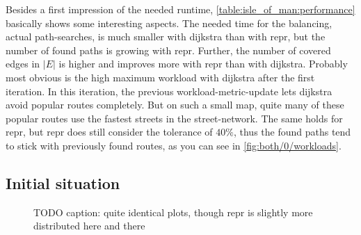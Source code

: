        Besides a first impression of the needed runtime, \vref{table:isle_of_man:performance} basically shows some interesting aspects.
        The needed time for the \gls{balancing}, actual path-searches, is much smaller with \gls{dijkstra} than with \gls{repr}, but the number of found paths is growing with \gls{repr}.
        Further, the number of covered edges in $|E|$ is higher and improves more with \gls{repr} than with \gls{dijkstra}.
        Probably most obvious is the high maximum workload with \gls{dijkstra} after the first iteration.
        In this iteration, the previous workload-\gls{metric}-update lets \gls{dijkstra} avoid popular routes completely.
        But on such a small map, quite many of these popular routes use the fastest streets in the street-network.
        The same holds for \gls{repr}, but \gls{repr} does still consider the tolerance of $\si{40 \percent}$, thus the found paths tend to stick with previously found routes, as you can see in \vref{fig:both/0/workloads}.

    \subsection{Initial situation}


        \begin{figure}[htb]
            \centering%
            \hfill%
            \caption[Initial workloads when balancing]{%
                TODO caption: quite identical plots, though \gls{repr} is slightly more distributed here and there
                \label{fig:both/0/workloads}
            }
        \end{figure}


